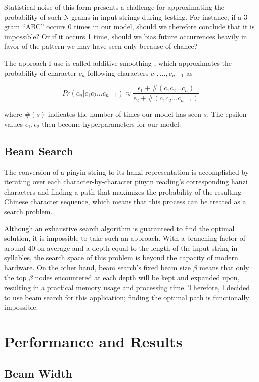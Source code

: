 \documentclass[11pt]{ctexart}
\begin{document}
Statistical noise of this form presents a challenge for approximating
the probability of such N-grams in input strings during testing. For
instance, if a 3-gram ``ABC'' occurs 0 times in our model, should
we therefore conclude that it is impossible? Or if it occurs 1 time, 
should we bias future occurrences heavily in favor of the pattern we
may have seen only because of chance?

The approach I use is called additive smoothing \cite{smoothing},
which approximates the probability of character $c_n$ following
characters $c_1, \ldots, c_{n-1}$ as

$$
Pr(c_n | c_1 c_2 \ldots c_{n-1}) \approx
\frac{\epsilon_1 + \#(c_1 c_2 \ldots c_n)}{\epsilon_2 + \#(c_1 c_2 \ldots c_{n-1})}
$$

where $\#(s)$ indicates the number of times our model has seen $s$.
The epsilon values $\epsilon_1, \epsilon_2$ then become hyperparameters
for our model.


\subsection{Beam Search}

The conversion of a pinyin string to its hanzi representation is accomplished by iterating over each character-by-character pinyin reading's corresponding hanzi characters and finding a path that maximizes the probability of the resulting Chinese character sequence, which means that this process can be treated as a search problem. 

Although an exhaustive search algorithm is guaranteed to find the optimal solution, it is impossible to take such an approach. With a branching factor of around 40 on average and a depth equal to the length of the input string in syllables, the search space of this problem is beyond the capacity of modern hardware. On the other hand, beam search's fixed beam size $\beta$ means that only the top $\beta$ nodes encountered at each depth will be kept and expanded upon, resulting in a practical memory usage and processing time. Therefore, I decided to use beam search for this application; finding the optimal path is functionally impossible.


\section{Performance and Results}

\subsection{Beam Width}
\end{document}

